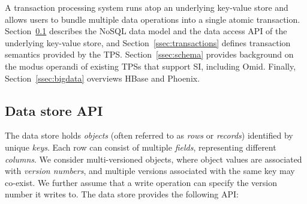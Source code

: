 A transaction processing system runs atop an underlying 
key-value store and allows users to bundle multiple data operations 
into a single atomic transaction. Section~\ref{ssec:data-model} describes the NoSQL data 
model and the data access API of the underlying key-value store, and  Section~\ref{ssec:transactions} defines transaction semantics
provided by the TPS. Section~\ref{ssec:schema} provides  background on the modus operandi 
of existing TPSs that support SI,  including Omid. Finally, Section~\ref{ssec:bigdata} overviews HBase and Phoenix. 

\subsection{Data store API}
\label{ssec:data-model}

The  data store holds  \emph{objects} (often referred to as \emph{rows} or {\em records}) identified by unique \emph{keys}.
Each row can consist of multiple \emph{fields}, representing different \emph{columns}. 
We consider multi-versioned objects, where object values are associated with \emph{version numbers}, and
multiple versions associated with the same key may co-exist.
We further assume that a write operation can specify the version number it writes to.
The  data store provides the following API:
